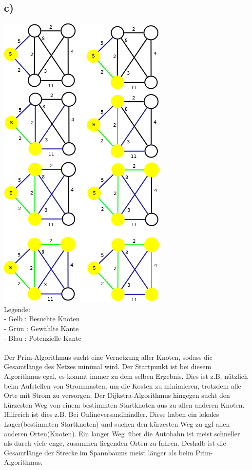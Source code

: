 \documentclass[a4paper,11pt,twoside]{article}
\begin{document}
\subsection*{c)} 
\includegraphics*[scale=1]{Bilder/2b_Prim.png}\\
Legende:\\
- Gelb : Besuchte Knoten\\
- Grün : Gewählte Kante\\
- Blau : Potenzielle Kante\\
\\
Der Prim-Algorithmus sucht eine Vernetzung aller Knoten, sodass die Gesamtlänge des Netzes minimal wird. Der Startpunkt ist bei diesem Algorithmus egal, es kommt immer zu dem selben Ergebnis. Dies ist z.B. nützlich beim Aufstellen von Strommasten, um die Kosten zu minimieren, trotzdem alle Orte mit Strom zu versorgen.
Der Dijkstra-Algorithmus hingegen sucht den kürzesten Weg von einem bestimmten Startknoten aus zu allen anderen Knoten. Hilfreich ist dies z.B. Bei Onlineversandhändler. Diese haben ein lokales Lager(bestimmten Startknoten) und suchen den kürzesten Weg zu ggf allen anderen Orten(Knoten). Ein \glqq langer Weg\grqq ~über die Autobahn ist meist schneller als durch viele enge, zusammen liegenden Orten zu fahren. Deshalb ist die Gesamtlänge der Strecke im Spannbaums meist länger als beim Prim-Algorithmus.
\end{document}
